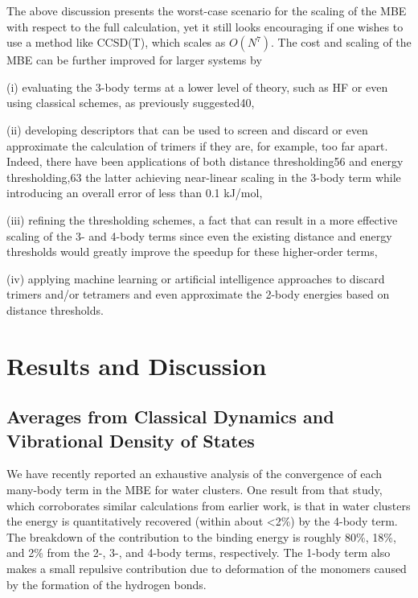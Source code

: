 \documentclass[11pt, proquest]{uwthesis}[2020/02/24]
\begin{document}
\par The above discussion presents the worst-case scenario for the scaling of the MBE with respect to the full calculation, yet it still looks encouraging if one wishes to use a method like CCSD(T), which scales as $O(N^7)$. The cost and scaling of the MBE can be further improved for larger systems by 
\par (i) evaluating the 3-body terms at a lower level of theory, such as HF or even using classical schemes, as previously suggested40,
\par (ii) developing descriptors that can be used to screen and discard or even approximate the calculation of trimers if they are, for example, too far apart. Indeed, there have been applications of both distance thresholding56 and energy thresholding,63 the latter achieving near-linear scaling in the 3-body term while introducing an overall error of less than 0.1 kJ/mol,
\par (iii) refining the thresholding schemes, a fact that can result in a more effective scaling of the 3- and 4-body terms since even the existing distance and energy thresholds would greatly improve the speedup for these higher-order terms,
\par (iv) applying machine learning or artificial intelligence approaches to discard trimers and/or tetramers and even approximate the 2-body energies based on distance thresholds.

\section{Results and Discussion}
\subsection{Averages from Classical Dynamics and Vibrational Density of States}
\par We have recently reported an exhaustive analysis of the convergence of each many-body term in the MBE for water clusters.\autocite{heindel_many-body_2020} One result from that study, which corroborates similar calculations from earlier work,\autocite{lao_understanding_2016} is that in water clusters the energy is quantitatively recovered (within about <2\%) by the 4-body term. The breakdown of the contribution to the binding energy is roughly 80\%, 18\%, and 2\% from the 2-, 3-, and 4-body terms, respectively. The 1-body term also makes a small repulsive contribution due to deformation of the monomers caused by the formation of the hydrogen bonds.
\end{document}
